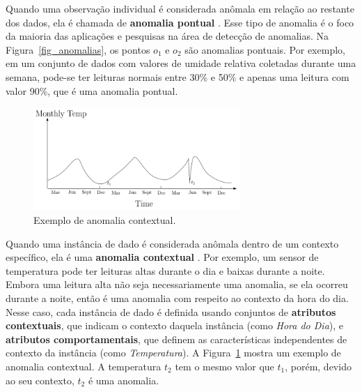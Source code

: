 \documentclass[cic,tc]{iiufrgs}
\begin{document}
Quando uma observação individual é considerada anômala em relação ao restante dos dados, ela é chamada de \textbf{anomalia pontual} \cite{AnomalyDetectionSurvey2009}. Esse tipo de anomalia é o foco da maioria das aplicações e pesquisas na área de detecção de anomalias. Na Figura~\ref{fig_anomalias}, os pontos $o_1$ e $o_2$ são anomalias pontuais. Por exemplo, em um conjunto de dados com valores de umidade relativa coletadas durante uma semana, pode-se ter leituras normais entre 30\% e 50\% e apenas uma leitura com valor 90\%, que é uma anomalia pontual. 

\bigskip
\begin{figure}
	\caption{Exemplo de anomalia contextual.}
	\bigskip
		\begin{center}
			\includegraphics[width=0.7\textwidth]{fig_contextuais.png}
		\end{center}
	\label{contextuais}
\end{figure}

Quando uma instância de dado é considerada anômala dentro de um contexto específico, ela é uma \textbf{anomalia contextual} \cite{AnomalyDetectionSurvey2009}. Por exemplo, um sensor de temperatura pode ter leituras altas durante o dia e baixas durante a noite. Embora uma leitura alta não seja necessariamente uma anomalia, se ela ocorreu durante a noite, então é uma anomalia com respeito ao contexto da hora do dia. Nesse caso, cada instância de dado é definida usando conjuntos de \textbf{atributos contextuais}, que indicam o contexto daquela instância (como \textit{Hora do Dia}), e \textbf{atributos comportamentais}, que definem as características independentes de contexto da instância (como \textit{Temperatura}). A Figura~\ref{contextuais} mostra um exemplo de anomalia contextual. A temperatura $t_2$ tem o mesmo valor que $t_1$, porém, devido ao seu contexto, $t_2$ é uma anomalia.
\end{document}
